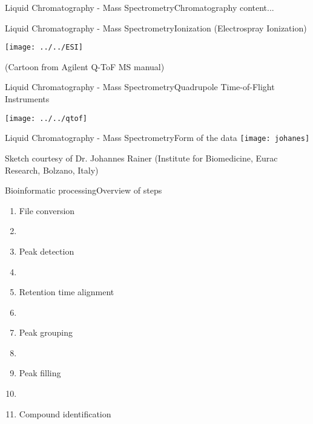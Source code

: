 \documentclass[xcolor=dvipsnames]{beamer}
\begin{document}
\begin{frame}{Liquid Chromatography - Mass Spectrometry}{Chromatography}
	content...
\end{frame}

\begin{frame}{Liquid Chromatography - Mass Spectrometry}{Ionization (Electrospray Ionization)}
\vspace{-7pt}
\begin{center}
	\texttt{[image: ../../ESI]}
	
	\tiny{(Cartoon from Agilent Q-ToF MS manual)}
\end{center}
\end{frame}

\begin{frame}{Liquid Chromatography - Mass Spectrometry}{Quadrupole Time-of-Flight Instruments}
\vspace{-7pt}
\begin{center}
	\texttt{[image: ../../qtof]}
\end{center}
\end{frame}

\begin{frame}{Liquid Chromatography - Mass Spectrometry}{Form of the data}
\vspace{-7pt}
\texttt{[image: johanes]}

\tiny{Sketch courtesy of Dr. Johannes Rainer (Institute for Biomedicine, Eurac Research, Bolzano, Italy)}
\end{frame}

\begin{frame}{Bioinformatic processing}{Overview of steps}
\vspace{-10pt}
\begin{enumerate}
	[default]
	\item File conversion
	\item[]
	\item Peak detection
	\item[]
	\item Retention time alignment
	\item[]
	\item Peak grouping
	\item[]
	\item Peak filling
	\item[]
	\item Compound identification
\end{enumerate}
\end{frame}
\end{document}
